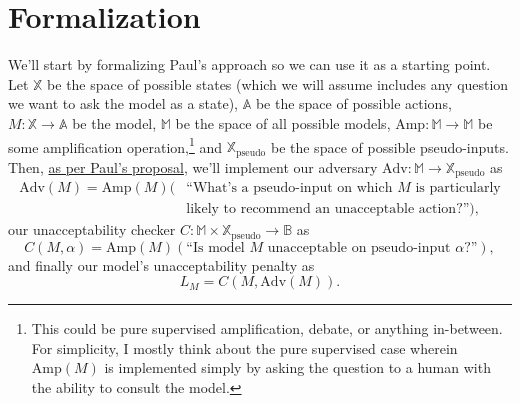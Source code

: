 \documentclass{amsart}
\begin{document}
\section{Formalization}

We'll start by formalizing Paul's approach so we can use it as a starting point. Let $\mathbb X$ be the space of possible states (which we will assume includes any question we want to ask the model as a state), $\mathbb A$ be the space of possible actions, $M: \mathbb X \to \mathbb A$ be the model, $\mathbb M$ be the space of all possible models, $\text{Amp}: \mathbb M \to \mathbb M$ be some amplification operation,\footnote{This could be pure supervised amplification, debate, or anything in-between. For simplicity, I mostly think about the pure supervised case wherein $\text{Amp}(M)$ is implemented simply by asking the question to a human with the ability to consult the model.} and $\mathbb X_\text{pseudo}$ be the space of possible pseudo-inputs. Then, \href{https://ai-alignment.com/training-robust-corrigibility-ce0e0a3b9b4d}{as per Paul's proposal}, we'll implement
our adversary $\text{Adv}: \mathbb M \to \mathbb X_\text{pseudo}$ as
\begin{align*}
    \text{Adv}(M) = \text{Amp}(M)(&\text{``What's a pseudo-input on which } M \text{ is particularly} \\
    & \text{likely to recommend an unacceptable action?''}),
\end{align*}
our unacceptability checker $C: \mathbb M \times \mathbb X_\text{pseudo} \to \mathbb B$ as
\[
    C(M, \alpha) = \text{Amp}(M)(\text{``Is model } M \text{ unacceptable on pseudo-input } \alpha \text{?''}),
\]
and finally our model's unacceptability penalty as
\[
    L_M = C(M, \text{Adv}(M)).
\]
\end{document}
